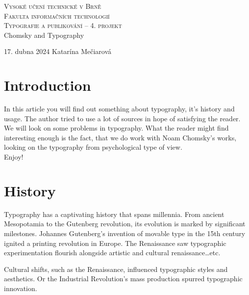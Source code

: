 \documentclass[11pt]{article}
\begin{document}
    \begin{titlepage}
        \begin{center}
            \Huge\textsc{Vysoké učení technické v Brně}\\
            \huge\textsc{Fakulta informačních technologií}\\
            \Large\textsc{Typografie a publikování – 4. projekt}\\
            \Huge{Chomsky and Typography}

        \end{center}
        {\LARGE 17. dubna 2024 \hfill
        Katarína Mečiarová}

    \end{titlepage}

    \tableofcontents
    \renewcommand{\cftsecleader}{\cftdotfill{\cftdotsep}}
    \setlength{\cftbeforesecskip}{0.5em}

    \newpage

    \section{Introduction}
    In this article you will find out something about typography, it's history and usage.
    The author tried to use a lot of sources in hope of satisfying the reader. \\
    We will look on some problems in typography. What the reader might find interesting enough
    is the fact, that we do work with Noam Chomsky's works, looking on the typography
    from psychological type of view. \\ Enjoy!

    \section{History}
    Typography has a captivating history that spans millennia\cite{ModernTypo}.
    From ancient Mesopotamia to the Gutenberg revolution, its evolution is marked by significant milestones.
    Johannes Gutenberg's invention of movable type in the 15th century ignited a printing revolution in Europe.
    The Renaissance saw typographic experimentation flourish\cite{rhythm}
    alongside artistic and cultural renaissance\ldots etc.

    Cultural shifts, such as the Renaissance, influenced typographic styles and aesthetics\cite{rhythm}.
    Or the Industrial Revolution's mass production spurred typographic innovation.
\end{document}
